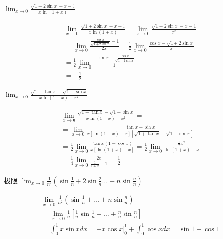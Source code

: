\documentclass{article}
\begin{document}
\begin{examplle}[]
\(\displaystyle\lim_{x\to0}\frac{\sqrt{1+2\sin x}-x-1}{x\ln(1+x)}\)

\begin{align*}
&\lim_{x\to0}\frac{\sqrt{1+2\sin x}-x-1}{x\ln(1+x)}=
\lim_{x\to0}\frac{\sqrt{1+2\sin x}-x-1}{x^2}\\
&=\lim_{x\to0}\frac{\frac{\cos x}{\sqrt{1+2\sin x}}-1}{2x}
=\frac{1}{2}\lim_{x\to0}\frac{\cos x-\sqrt{1+2\sin x}}{x}\\
& =\frac{1}{2}\lim_{x\to0}\frac{-\sin x-\frac{\cos x}{\sqrt{1+2\sin x}}}{1}\\
& =-\frac{1}{2}
\end{align*}
\end{examplle}

\begin{examplle}[]
\(\displaystyle\lim_{x\to0}\frac{\sqrt{1+\tan x}-\sqrt{1+\sin
   x}}{x\ln(1+x)-x^2}\)

\begin{align*}
&\lim_{x\to0}\frac{\sqrt{1+\tan x}-\sqrt{1+\sin
x}}{x\ln(1+x)-x^2}=\\
&=\lim_{x\to0}
\frac{\tan x-\sin x}{x[\ln(1+x)-x][\sqrt{1+\tan x}+\sqrt{1-\sin x}]}\\
&=\frac{1}{2}\lim_{x\to0}\frac{\tan x(1-\cos x)}{x[\ln(1+x)-x]}=
\frac{1}{2}\lim_{x\to0}\frac{\frac{1}{2}x^2}{\ln(1+x)-x}\\
&=\frac{1}{4}\lim_{x\to0}\frac{2x}{\frac{1}{1+x}-1}=\frac{1}{2}
\end{align*}
\end{examplle}

\begin{examplle}[]
极限
\(\displaystyle\lim_{x\to0}\frac{1}{n^2}(\sin\frac{1}{n}+2\sin\frac{2}{n}\dots+n\sin\frac{n}{n})\)

\begin{align*}
&\lim_{x\to0}\frac{1}{n^2}(\sin\frac{1}{n}+\dots+n\sin\frac{n}{n})\\
&=\lim_{x\to0}\frac{1}{n}
\left[\frac{1}{n}\sin\frac{1}{n}+\dots+\frac{n}{n}\sin\frac{n}{n}
\right]\\
&=\int_0^1x\sin xdx=-x\cos x\Big\rvert^1_0+\int_0^1\cos xdx=\sin1-\cos1
\end{align*}
\end{examplle}
\end{document}
